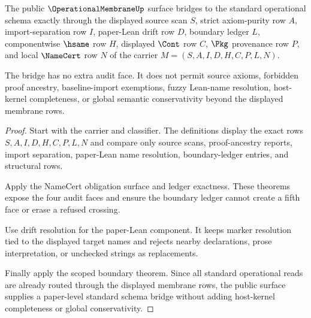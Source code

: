 \begin{theorem}
\label{thm:operational-membrane-standard-schema-bridge}
The public $\OperationalMembraneUp$ surface bridges to the standard operational schema exactly through the displayed source scan $S$, strict axiom-purity row $A$, import-separation row $I$, paper-Lean drift row $D$, boundary ledger $L$, componentwise $\hsame$ row $H$, displayed $\Cont$ row $C$, $\Pkg$ provenance row $P$, and local $\NameCert$ row $N$ of the carrier $M=(S,A,I,D,H,C,P,L,N)$.

The bridge has no extra audit face. It does not permit source axioms, forbidden proof ancestry, baseline-import exemptions, fuzzy Lean-name resolution, host-kernel completeness, or global semantic conservativity beyond the displayed membrane rows.
\end{theorem}
\begin{proof}
Start with the carrier and classifier. The definitions display the exact rows $S,A,I,D,H,C,P,L,N$ and compare only source scans, proof-ancestry reports, import separation, paper-Lean name resolution, boundary-ledger entries, and structural rows.

Apply the NameCert obligation surface and ledger exactness. These theorems expose the four audit faces and ensure the boundary ledger cannot create a fifth face or erase a refused crossing.

Use drift resolution for the paper-Lean component. It keeps marker resolution tied to the displayed target names and rejects nearby declarations, prose interpretation, or unchecked strings as replacements.

Finally apply the scoped boundary theorem. Since all standard operational reads are already routed through the displayed membrane rows, the public surface supplies a paper-level standard schema bridge without adding host-kernel completeness or global conservativity.
\end{proof}

